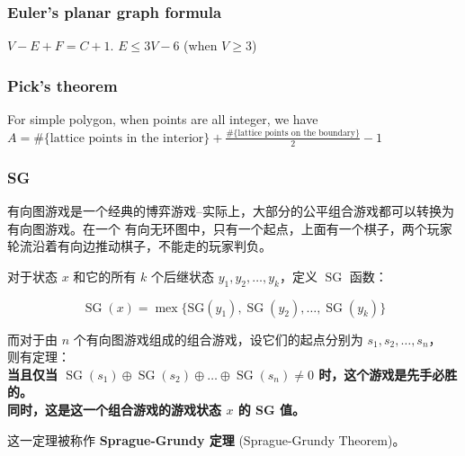 \subsubsection{Euler's planar graph formula}
$V-E+F=C+1$. $E\leq 3V-6$ (when $V\geq 3$)

\subsubsection{Pick's theorem}
For simple polygon, when points are all integer, we have $A=\text{\#\{lattice points in the interior\}} + \frac{\text{\#\{lattice points on the boundary\}}}{2} - 1$

\subsubsection{SG}
\noindent 有向图游戏是一个经典的博弈游戏--实际上，大部分的公平组合游戏都可以转换为有向图游戏。在一个
有向无环图中，只有一个起点，上面有一个棋子，两个玩家轮流沿着有向边推动棋子，不能走的玩家判负。

\noindent 对于状态 $x$ 和它的所有 $k$ 个后继状态 $y_1, y_2, \ldots, y_k$，定义 $\operatorname{SG}$ 函数：

$$
\operatorname{SG}(x)=\operatorname{mex}\{\text{SG}(y_1), \operatorname{SG}(y_2), \ldots, \operatorname{SG}(y_k)\}
$$

\noindent 而对于由 $n$ 个有向图游戏组成的组合游戏，设它们的起点分别为 $s_1, s_2, \ldots, s_n$，\\
则有定理：\\
\textbf{当且仅当 $\operatorname{SG}(s_1) \oplus \operatorname{SG}(s_2) \oplus \ldots \oplus \operatorname{SG}(s_n) \neq 0$ 时，这个游戏是先手必胜的。\\
同时，这是这一个组合游戏的游戏状态 $x$ 的 SG 值。}

\noindent 这一定理被称作 \textbf{Sprague-Grundy 定理} (Sprague-Grundy Theorem)。